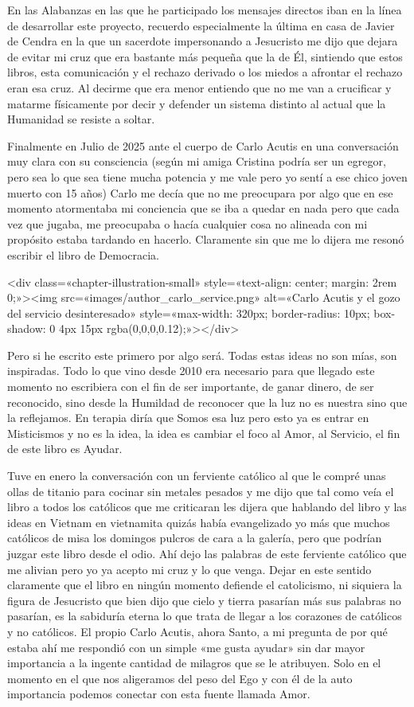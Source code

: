 \documentclass[11pt,a5paper]{book}
\begin{document}
En las Alabanzas en las que he participado los mensajes directos iban en la línea de desarrollar este proyecto, recuerdo especialmente la última en casa de Javier de Cendra en la que un sacerdote impersonando a Jesucristo me dijo que dejara de evitar mi cruz que era bastante más pequeña que la de Él, sintiendo que estos libros, esta comunicación y el rechazo derivado o los miedos a afrontar el rechazo eran esa cruz. Al decirme que era menor entiendo que no me van a crucificar y matarme físicamente por decir y defender un sistema distinto al actual que la Humanidad se resiste a soltar.

Finalmente en Julio de 2025 ante el cuerpo de Carlo Acutis en una conversación muy clara con su consciencia (según mi amiga Cristina podría ser un egregor, pero sea lo que sea tiene mucha potencia y me vale pero yo sentí a ese chico joven muerto con 15 años) Carlo me decía que no me preocupara por algo que en ese momento atormentaba mi conciencia que se iba a quedar en nada pero que cada vez que jugaba, me preocupaba o hacía cualquier cosa no alineada con mi propósito estaba tardando en hacerlo. Claramente sin que me lo dijera me resonó escribir el libro de Democracia.

<div class=«chapter-illustration-small» style=«text-align: center; margin: 2rem 0;»><img src=«images/author_carlo_service.png» alt=«Carlo Acutis y el gozo del servicio desinteresado» style=«max-width: 320px; border-radius: 10px; box-shadow: 0 4px 15px rgba(0,0,0,0.12);»></div>

Pero si he escrito este primero por algo será. Todas estas ideas no son mías, son inspiradas. Todo lo que vino desde 2010 era necesario para que llegado este momento no escribiera con el fin de ser importante, de ganar dinero, de ser reconocido, sino desde la Humildad de reconocer que la luz no es nuestra sino que la reflejamos. En terapia diría que Somos esa luz pero esto ya es entrar en Misticismos y no es la idea, la idea es cambiar el foco al Amor, al Servicio, el fin de este libro es Ayudar.

Tuve en enero la conversación con un ferviente católico al que le compré unas ollas de titanio para cocinar sin metales pesados y me dijo que tal como veía el libro a todos los católicos que me criticaran les dijera que hablando del libro y las ideas en Vietnam en vietnamita quizás había evangelizado yo más que muchos católicos de misa los domingos pulcros de cara a la galería, pero que podrían juzgar este libro desde el odio. Ahí dejo las palabras de este ferviente católico que me alivian pero yo ya acepto mi cruz y lo que venga. Dejar en este sentido claramente que el libro en ningún momento defiende el catolicismo, ni siquiera la figura de Jesucristo que bien dijo que cielo y tierra pasarían más sus palabras no pasarían, es la sabiduría eterna lo que trata de llegar a los corazones de católicos y no católicos. El propio Carlo Acutis, ahora Santo, a mi pregunta de por qué estaba ahí me respondió con un simple «me gusta ayudar» sin dar mayor importancia a la ingente cantidad de milagros que se le atribuyen. Solo en el momento en el que nos aligeramos del peso del Ego y con él de la auto importancia podemos conectar con esta fuente llamada Amor.
\end{document}
